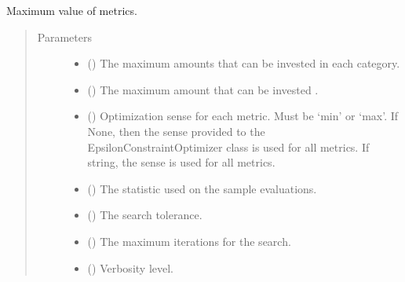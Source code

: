 \documentclass[letterpaper,10pt,english]{sphinxmanual}
\begin{document}
\begin{fulllineitems}
\begin{fulllineitems}
\label{\detokenize{doc-src/tyche:tyche.EpsilonConstraints.EpsilonConstraintOptimizer.optimum_metrics}}
Maximum value of metrics.
\begin{quote}\begin{description}
\item[{Parameters}] \leavevmode\begin{itemize}
\item {} 
 () \textendash{} The maximum amounts that can be invested in each category.

\item {} 
 () \textendash{} The maximum amount that can be invested .

\item {} 
 () \textendash{} Optimization sense for each metric. Must be ‘min’ or ‘max’. If None, then
the sense provided to the EpsilonConstraintOptimizer class is used for
all metrics. If string, the sense is used for all metrics.

\item {} 
 () \textendash{} The statistic used on the sample evaluations.

\item {} 
 () \textendash{} The search tolerance.

\item {} 
 () \textendash{} The maximum iterations for the search.

\item {} 
 () \textendash{} Verbosity level.

\end{itemize}

\end{description}\end{quote}

\end{fulllineitems}


\end{fulllineitems}
\end{document}
